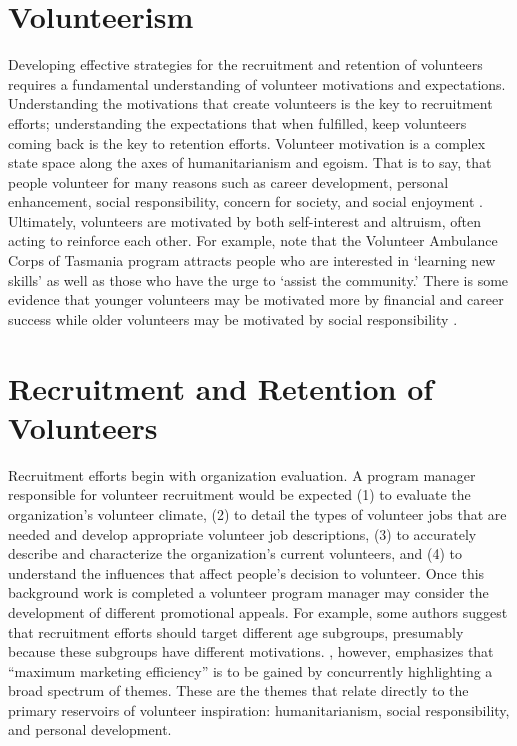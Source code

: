 \documentclass[11pt,fleqn]{book} %
\begin{document}
\section{Volunteerism}
Developing effective strategies for the recruitment and retention of volunteers requires a fundamental understanding of volunteer motivations and expectations. Understanding the motivations that create volunteers is the key to recruitment efforts; understanding the expectations that when fulfilled, keep volunteers coming back is the key to retention efforts. Volunteer motivation is a complex state space along the axes of humanitarianism and egoism. That is to say, that people volunteer for many reasons such as career development, personal enhancement, social responsibility, concern for society, and social enjoyment \autocite{shields_young_2009}. Ultimately, volunteers are motivated by both self-interest and altruism, often acting to reinforce each other. For example, \textcite{fahey_training_2002} note that the Volunteer Ambulance Corps of Tasmania program attracts people who are interested in \enquote*{learning new skills} as well as those who have the urge to \enquote*{assist the community.} There is some evidence that younger volunteers may be motivated more by financial and career success while older volunteers may be motivated by social responsibility \autocite{shields_young_2009}.



\section{Recruitment and Retention of Volunteers}

Recruitment efforts begin with organization evaluation. A program manager responsible for volunteer recruitment would be expected (1) to evaluate the organization's volunteer climate, (2) to detail the types of volunteer jobs that are needed and develop appropriate volunteer job descriptions, (3) to accurately  describe and characterize the organization's current volunteers, and (4) to understand the influences that affect people's decision to volunteer. Once this background work is completed a volunteer program manager may consider the development of different promotional appeals. For example, some authors suggest that recruitment efforts should target different age subgroups, presumably because these subgroups have different motivations. \textcite{shields_young_2009}, however, emphasizes that \enquote{maximum marketing efficiency} is to be gained by concurrently highlighting a broad spectrum of themes. These are the themes that relate directly to the primary reservoirs of volunteer inspiration: humanitarianism, social responsibility, and personal development.\\
\end{document}
